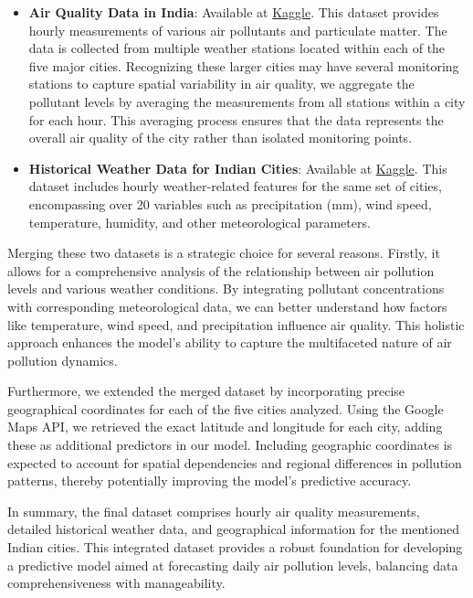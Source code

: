 \documentclass[12pt]{article}
\begin{document}
\begin{itemize}
    \item \textbf{Air Quality Data in India}: Available at \href{https://www.kaggle.com/datasets/rohanrao/air-quality-data-in-india}{Kaggle}. This dataset provides hourly measurements of various air pollutants and particulate matter. The data is collected from multiple weather stations located within each of the five major cities. Recognizing these larger cities may have several monitoring stations to capture spatial variability in air quality, we aggregate the pollutant levels by averaging the measurements from all stations within a city for each hour. This averaging process ensures that the data represents the overall air quality of the city rather than isolated monitoring points.

    \item \textbf{Historical Weather Data for Indian Cities}\cite{hitesh_soneji_2020}: Available at \href{https://www.kaggle.com/datasets/hiteshsoneji/historical-weather-data-for-indian-cities}{Kaggle}. This dataset includes hourly weather-related features for the same set of cities, encompassing over 20 variables such as precipitation (mm), wind speed, temperature, humidity, and other meteorological parameters.
\end{itemize}

Merging these two datasets is a strategic choice for several reasons. Firstly, it allows for a comprehensive analysis of the relationship between air pollution levels and various weather conditions. By integrating pollutant concentrations with corresponding meteorological data, we can better understand how factors like temperature, wind speed, and precipitation influence air quality. This holistic approach enhances the model's ability to capture the multifaceted nature of air pollution dynamics.

Furthermore, we extended the merged dataset by incorporating precise geographical coordinates for each of the five cities analyzed. Using the Google Maps API, we retrieved the exact latitude and longitude for each city, adding these as additional predictors in our model. Including geographic coordinates is expected to account for spatial dependencies and regional differences in pollution patterns, thereby potentially improving the model's predictive accuracy.

In summary, the final dataset comprises hourly air quality measurements, detailed historical weather data, and geographical information for the mentioned Indian cities. This integrated dataset provides a robust foundation for developing a predictive model aimed at forecasting daily air pollution levels, balancing data comprehensiveness with manageability.
\end{document}
